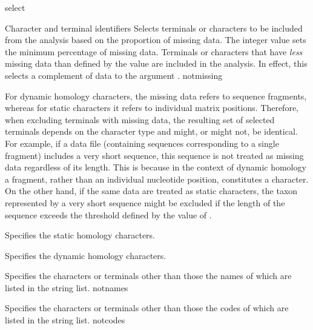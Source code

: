 \begin{command}{select}{}
\begin{arguments}
\begin{argumentgroup}{Character and terminal identifiers}
                {Selects terminals or characters to be included from the analysis
                based on the proportion of missing data. The
                integer value sets the minimum percentage of missing
                data. Terminals or characters that have  \emph{less} missing data
                than defined by the value are included in the analysis.
                In effect, this selects a complement of data to the argument .}
                {notmissing} 

                \begin{statement}
                For dynamic homology characters, the missing data refers to
                sequence fragments, whereas for static characters it refers to
                individual matrix positions. Therefore, when excluding
                terminals with missing data, the resulting set of selected
                terminals depends on the character type and might, or
                might not, be identical. For example, if a data file (containing
                sequences corresponding to a single fragment) includes
                a very short sequence, this sequence is not treated as
                missing data regardless of its length. This is because in the
                context of dynamic homology a fragment, rather than an
                individual nucleotide position, constitutes a character.
                On the other hand, if the same data are treated as static characters,
                the taxon represented by a very short sequence
                might be excluded if the length of the sequence exceeds the
                threshold defined by the value of .
                \end{statement}

                {Specifies the static homology characters.}
                {}

                {Specifies the dynamic homology characters.}
                {}

                {Specifies the characters or terminals other than those the
                names of which are listed in the string list.}
                {notnames}

                {Specifies the characters or terminals other than those the
                codes of which are listed in the string list.}
                {notcodes}


\end{argumentgroup}
\end{arguments}
\end{command}
